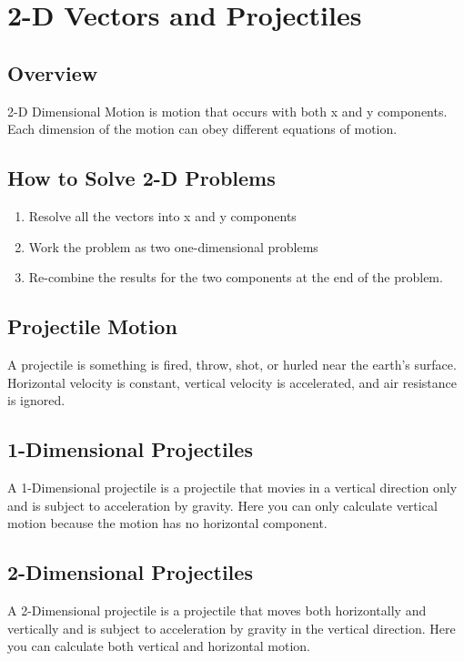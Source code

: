\section{2-D Vectors and Projectiles}
	
\subsection{Overview}
2-D Dimensional Motion is motion that occurs with both x and y components. Each dimension of the motion can obey different equations of motion.
	
\subsection{How to Solve 2-D Problems}
\begin{enumerate}
	\item Resolve all the vectors into x and y components
	\item Work the problem as two one-dimensional problems
	\item Re-combine the results for the two components at the end of the problem. 
\end{enumerate}
	
\subsection{Projectile Motion}
A projectile is something is fired, throw, shot, or hurled near the earth's surface. Horizontal velocity is constant, vertical velocity is accelerated, and air resistance is ignored. 
	
\subsection{1-Dimensional Projectiles}
A 1-Dimensional projectile is a projectile that movies in a vertical direction only and is subject to acceleration by gravity. Here you can only calculate vertical motion because the motion has no horizontal component.
	
\subsection{2-Dimensional Projectiles}
A 2-Dimensional projectile is a projectile that moves both horizontally and vertically and is subject to acceleration by gravity in the vertical direction. Here you can calculate both vertical and horizontal motion.
	
